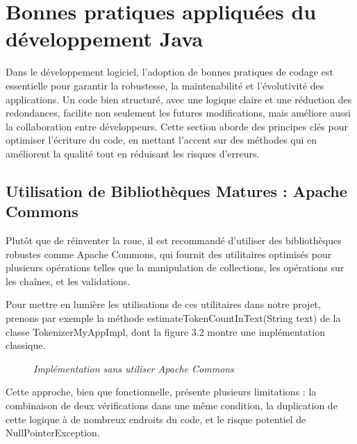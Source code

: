 \documentclass[12pt,a4paper]{report}
\begin{document}
	\section{Bonnes pratiques appliquées du développement Java}
	
	Dans le développement logiciel, l'adoption de bonnes pratiques de codage est essentielle pour garantir la robustesse, la maintenabilité et l'évolutivité des applications. Un code bien structuré, avec une logique claire et une réduction des redondances, facilite non seulement les futures modifications, mais améliore aussi la collaboration entre développeurs. Cette section aborde des principes clés pour optimiser l'écriture du code, en mettant l'accent sur des méthodes qui en améliorent la qualité tout en réduisant les risques d'erreurs.
	
	\subsection{Utilisation de Bibliothèques Matures : Apache Commons}
	
	Plutôt que de réinventer la roue, il est recommandé d’utiliser des bibliothèques robustes comme Apache Commons, qui fournit des utilitaires optimisés pour plusieurs opérations telles que la manipulation de collections, les opérations sur les chaînes, et les validations.
	
	Pour mettre en lumière les utilisations de ces utilitaires dans notre projet, prenons par exemple la méthode estimateTokenCountInText(String text) de la classe TokenizerMyAppImpl, dont la figure 3.2 montre une implémentation classique.
	
	\begin{figure}[H]
		\centering
		\caption{\textit{Implémentation sans utiliser Apache Commons}}
		\label{fig:before-string-utils}
	\end{figure}
	
	Cette approche, bien que fonctionnelle, présente plusieurs limitations : la combinaison de deux vérifications dans une même condition, la duplication de cette logique à de nombreux endroits du code, et le risque potentiel de NullPointerException.
	
\end{document}
